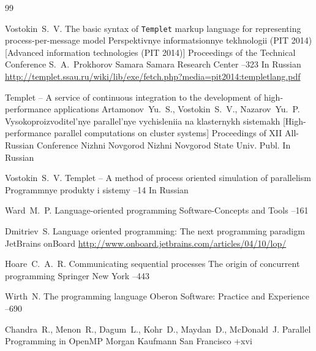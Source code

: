 \begin{thebibliography}{99}

\by Vostokin~S.~V.
\paper The basic syntax of {\tt Templet} markup language for representing   process-per-message model
\inbook Perspektivnye informatsionnye tekhnologii (PIT 2014) \rm [Advanced information technologies (PIT 2014)]
\bookinfo Proceedings of the Technical Conference
\ed S.~A.~Prokhorov
\publaddr Samara
\publ Samara Research Center
--323
\lang In Russian
\elink \url{http://templet.ssau.ru/wiki/lib/exe/fetch.php?media=pit2014:templetlang.pdf}


\paper Templet – A service of continuous integration  to the development  of high-performance applications
\by Artamonov~Yu.~S.,  Vostokin~S.~V., Nazarov~Yu.~P.
\inbook Vysokoproizvoditel'nye parallel'nye vychisleniia na klasternykh sistemakh \rm [High-performance parallel computations on cluster systems]
\bookinfo Proceedings of XII All-Russian Conference
\publaddr Nizhni Novgorod
\publ Nizhni Novgorod State Univ. Publ.
\lang In Russian


\by Vostokin~S.~V. 
\paper Templet – A method of process oriented simulation of parallelism
\jour Programmnye produkty i sistemy
--14
\lang In Russian




\by Ward~M.~P. 
\paper Language-oriented programming 
\jour Software-Concepts and Tools
--161

\by Dmitriev~S.
\preprint Language oriented programming: The next programming paradigm 
\preprintinfo  JetBrains onBoard
\elink \url{http://www.onboard.jetbrains.com/articles/04/10/lop/}

\by  Hoare~C.~A.~R.
\paper Communicating sequential processes 
\inbook The origin of concurrent prog\-ramming
\publ Springer 
\publaddr New York
--443

\by Wirth~N. 
\paper The programming language Oberon 
\jour Software: Practice and Experience
--690

\by Chandra~R., Menon~R., Dagum~L., Kohr~D., Maydan~D., McDonald~J.
\book Parallel Programming in OpenMP
\publ Morgan Kaufmann
\publaddr San Francisco
+xvi


\end{thebibliography}
